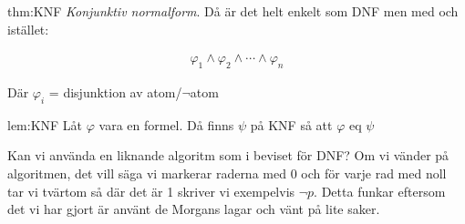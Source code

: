 \newpage
\par\bigskip
\begin{theo}[KNF]{thm:KNF}
  \textit{Konjunktiv normalform}. Då är det helt enkelt som DNF men med och istället:

  \begin{equation*}
    \begin{gathered}
      \varphi_1\wedge\varphi_2\wedge\cdots\wedge\varphi_n
    \end{gathered}
  \end{equation*}
  \par\bigskip
  \noindent Där $\varphi_i$ = disjunktion av atom/$\neg$atom
\end{theo}
\par\bigskip

\begin{lem}{lem:KNF}
  Låt $\varphi$ vara en formel. Då finns $\psi$ på KNF så att $\varphi$ eq $\psi$
\end{lem}
\par\bigskip
\noindent Kan vi använda en liknande algoritm som i beviset för DNF? Om vi vänder på algoritmen, det vill säga vi markerar raderna med 0 och för varje rad med noll tar vi tvärtom så där det är 1 skriver vi exempelvis $\neg p$. Detta funkar eftersom det vi har gjort är använt de Morgans lagar och vänt på lite saker.






